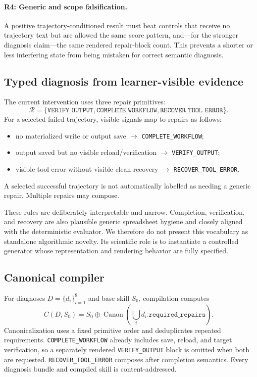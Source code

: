 \paragraph{R4: Generic and scope falsification.}
A positive trajectory-conditioned result must beat controls that receive no trajectory text but are allowed the same score pattern, and---for the stronger diagnosis claim---the same rendered repair-block count. This prevents a shorter or less interfering state from being mistaken for correct semantic diagnosis.

\subsection{Typed diagnosis from learner-visible evidence}
The current intervention uses three repair primitives:
\begin{equation}
\mathcal{R}=\{\texttt{VERIFY\_OUTPUT},\texttt{COMPLETE\_WORKFLOW},\texttt{RECOVER\_TOOL\_ERROR}\}.
\end{equation}
For a selected failed trajectory, visible signals map to repairs as follows:
\begin{itemize}
    \item no materialized write or output save $\rightarrow$ \texttt{COMPLETE\_WORKFLOW};
    \item output saved but no visible reload/verification $\rightarrow$ \texttt{VERIFY\_OUTPUT};
    \item visible tool error without visible clean recovery $\rightarrow$ \texttt{RECOVER\_TOOL\_ERROR}.
\end{itemize}
A selected successful trajectory is not automatically labelled as needing a generic repair. Multiple repairs may compose.

These rules are deliberately interpretable and narrow. Completion, verification, and recovery are also plausible generic spreadsheet hygiene and closely aligned with the deterministic evaluator. We therefore do not present this vocabulary as standalone algorithmic novelty. Its scientific role is to instantiate a controlled generator whose representation and rendering behavior are fully specified.

\subsection{Canonical compiler}
For diagnoses $D=\{d_i\}_{i=1}^{8}$ and base skill $S_0$, compilation computes
\begin{equation}
C(D,S_0)=S_0\oplus \operatorname{Canon}\!\left(\bigcup_i d_i.\texttt{required\_repairs}\right).
\end{equation}
Canonicalization uses a fixed primitive order and deduplicates repeated requirements. \texttt{COMPLETE\_WORKFLOW} already includes save, reload, and target verification, so a separately rendered \texttt{VERIFY\_OUTPUT} block is omitted when both are requested. \texttt{RECOVER\_TOOL\_ERROR} composes after completion semantics. Every diagnosis bundle and compiled skill is content-addressed.

